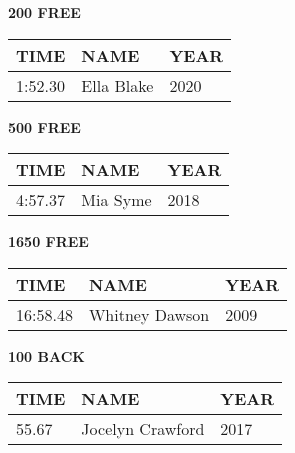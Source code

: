 \vspace{0.4cm}

\begin{minipage}[t]{0.48\textwidth}
\centering
\textbf{200 FREE}\\[0.05cm]
\begin{tabular}{@{}p{1.8cm}p{2.8cm}p{1.2cm}@{}}
\hline
\textbf{TIME} & \textbf{NAME} & \textbf{YEAR} \\
\hline
1:52.30 & Ella Blake & 2020 \\
\hline
\end{tabular}
\end{minipage}\hfill
\begin{minipage}[t]{0.48\textwidth}
\centering
\textbf{500 FREE}\\[0.05cm]
\begin{tabular}{@{}p{1.8cm}p{2.8cm}p{1.2cm}@{}}
\hline
\textbf{TIME} & \textbf{NAME} & \textbf{YEAR} \\
\hline
4:57.37 & Mia Syme & 2018 \\
\hline
\end{tabular}
\end{minipage}

\vspace{0.4cm}

\begin{minipage}[t]{0.48\textwidth}
\centering
\textbf{1650 FREE}\\[0.05cm]
\begin{tabular}{@{}p{1.8cm}p{2.8cm}p{1.2cm}@{}}
\hline
\textbf{TIME} & \textbf{NAME} & \textbf{YEAR} \\
\hline
16:58.48 & Whitney Dawson & 2009 \\
\hline
\end{tabular}
\end{minipage}\hfill
\begin{minipage}[t]{0.48\textwidth}
\centering
\textbf{100 BACK}\\[0.05cm]
\begin{tabular}{@{}p{1.8cm}p{2.8cm}p{1.2cm}@{}}
\hline
\textbf{TIME} & \textbf{NAME} & \textbf{YEAR} \\
\hline
55.67 & Jocelyn Crawford & 2017 \\
\hline
\end{tabular}
\end{minipage}

\vspace{0.4cm}

